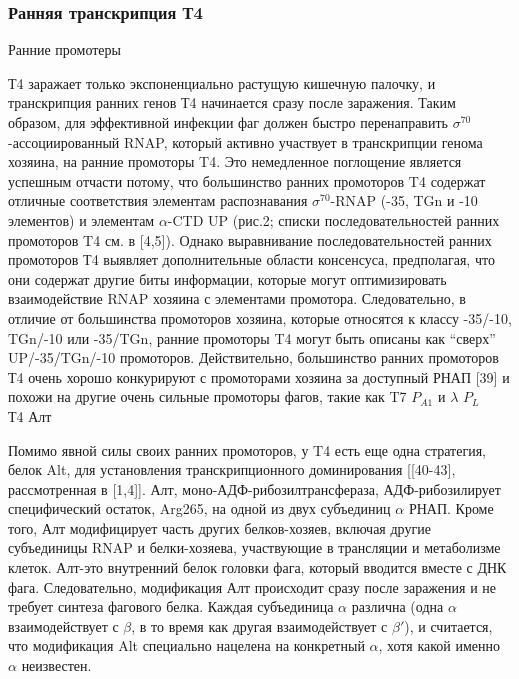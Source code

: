 \documentclass[a4paper,12pt]{article}
\begin{document}
    \subsubsection{Ранняя транскрипция Т4}
        {\Large Ранние промотеры}
            \par{Т4 заражает только экспоненциально растущую кишечную палочку, и транскрипция ранних генов Т4 начинается сразу
            после заражения. Таким образом, для эффективной инфекции фаг должен быстро перенаправить
            \(\sigma^{70}\)-ассоциированный RNAP, который активно участвует в транскрипции генома хозяина, на ранние
            промоторы T4. Это немедленное поглощение является успешным отчасти потому, что большинство ранних промоторов
            T4 содержат отличные соответствия элементам распознавания \(\sigma^{70}\)-RNAP (-35, TGn и -10 элементов) и
            элементам \(\alpha\)-CTD UP (рис.2; списки последовательностей ранних промоторов T4 см. в [4,5]). Однако
            выравнивание последовательностей ранних промоторов Т4 выявляет дополнительные области консенсуса,
            предполагая, что они содержат другие биты информации, которые могут оптимизировать взаимодействие RNAP
            хозяина с элементами промотора. Следовательно, в отличие от большинства промоторов хозяина, которые относятся
            к классу -35/-10, TGn/-10 или -35/TGn, ранние промоторы T4 могут быть описаны как “сверх” UP/-35/TGn/-10
            промоторов. Действительно, большинство ранних промоторов Т4 очень хорошо конкурируют с промоторами хозяина за
            доступный РНАП [39] и похожи на другие очень сильные промоторы фагов, такие как T7 \(P_{A1}\) и \(\lambda\)
            $ P_L $}\\
        { Т4 Алт}
            \par{Помимо явной силы своих ранних промоторов, у T4 есть еще одна стратегия, белок Alt, для установления
            транскрипционного доминирования [[40-43], рассмотренная в [1,4]]. Алт, моно-АДФ-рибозилтрансфераза,
            АДФ-рибозилирует специфический остаток, Arg265, на одной из двух субъединиц \(\alpha\) РНАП. Кроме того, Алт
            модифицирует часть других белков-хозяев, включая другие субъединицы RNAP и белки-хозяева, участвующие в
            трансляции и метаболизме клеток. Алт-это внутренний белок головки фага, который вводится вместе с ДНК фага.
            Следовательно, модификация Алт происходит сразу после заражения и не требует синтеза фагового белка. Каждая
            субъединица \(\alpha\) различна (одна \(\alpha\) взаимодействует с \(\beta\), в то время как другая
            взаимодействует с \(\beta'\)), и считается, что модификация Alt специально нацелена на конкретный \(\alpha\),
            хотя какой именно \(\alpha\) неизвестен.}
\end{document}
